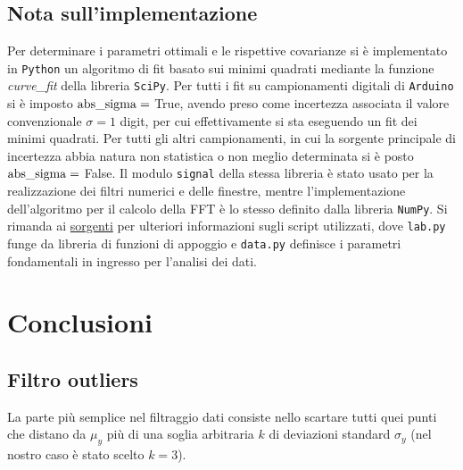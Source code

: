 \documentclass{article}[a4paper, oneside, 11pt]
\begin{document}
\subsection{Nota sull'implementazione}
Per determinare i parametri ottimali e le rispettive covarianze si \`e
implementato in \verb+Python+ un algoritmo di fit basato sui minimi quadrati
mediante la funzione \emph{curve\_fit} della libreria 
\texttt{SciPy}\cite{scipy}.
Per tutti i fit su campionamenti digitali di \verb+Arduino+ si \`e imposto
$\rm{abs\_sigma} =$ True, avendo preso come incertezza associata il valore
convenzionale $\sigma = 1$ digit, per cui effettivamente si sta eseguendo
un fit dei minimi quadrati. Per tutti gli altri campionamenti, in cui la
sorgente principale di incertezza abbia natura non statistica o non meglio
determinata si è posto $\rm{abs\_sigma} =$ False. 
Il modulo \texttt{signal} della stessa libreria è stato usato per
la realizzazione dei filtri numerici e delle finestre, mentre
l'implementazione dell'algoritmo per il calcolo della FFT è lo stesso
definito dalla libreria \texttt{NumPy}\cite{numpy}.
Si rimanda ai
\href{https://github.com/BernardoTomelleri/FFT/tree/master}{sorgenti}
per ulteriori informazioni sugli script utilizzati, dove \verb+lab.py+ funge
da libreria di funzioni di appoggio e \verb+data.py+ definisce i parametri
fondamentali in ingresso per l'analisi dei dati.
\section{Conclusioni}

\subsection{Filtro outliers}
La parte pi\`u semplice nel filtraggio dati consiste nello scartare tutti quei
punti che distano da $\mu_y$ pi\`u di una soglia arbitraria $k$ di deviazioni
standard $\sigma_y$ (nel nostro caso \`e stato scelto $k = 3$).

\medskip


\end{document}
